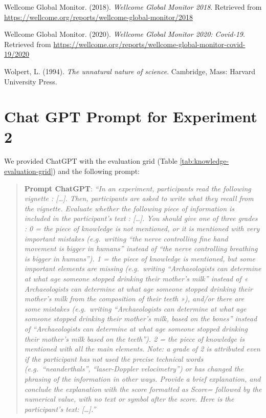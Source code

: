 \documentclass[
  english,
  doc,floatsintext]{apa6}
\newlength{\cslhangindent}
\newenvironment{CSLReferences}[2] %
 {\begin{list}{}{%
  \setlength{\itemindent}{0pt}
  \setlength{\leftmargin}{0pt}
  \setlength{\parsep}{0pt}
  \ifodd #1
   \setlength{\leftmargin}{\cslhangindent}
   \setlength{\itemindent}{-1\cslhangindent}
  \fi
  \setlength{\itemsep}{#2\baselineskip}}}
 {\end{list}}
\begin{document}
\begin{CSLReferences}{1}{0}
Wellcome Global Monitor. (2018). \emph{Wellcome Global Monitor 2018}. Retrieved from \url{https://wellcome.org/reports/wellcome-global-monitor/2018}

Wellcome Global Monitor. (2020). \emph{Wellcome Global Monitor 2020: Covid-19}. Retrieved from \url{https://wellcome.org/reports/wellcome-global-monitor-covid-19/2020}

Wolpert, L. (1994). \emph{The unnatural nature of science}. Cambridge, Mass: Harvard University Press.

\end{CSLReferences}

\newpage

\appendix


\section{Chat GPT Prompt for Experiment 2}\label{gpt-prompt}

\FloatBarrier

We provided ChatGPT with the evaluation grid (Table \ref{tab:knowledge-evaluation-grid}) and the following prompt:

\begin{quote}
\textbf{Prompt ChatGPT}: \emph{``In an experiment, participants read the following vignette : {[}\ldots{]}. Then, participants are asked to write what they recall from the vignette. Evaluate whether the following piece of information is included in the participant's text : {[}\ldots{]}. You should give one of three grades : 0 = the piece of knowledge is not mentioned, or it is mentioned with very important mistakes (e.g.~writing ``the nerve controlling fine hand movement is bigger in humans'' instead of ``the nerve controlling breathing is bigger in humans''). 1 = the piece of knowledge is mentioned, but some important elements are missing (e.g.~writing ``Archaeologists can determine at what age someone stopped drinking their mother's milk'' instead of « Archaeologists can determine at what age someone stopped drinking their mother's milk from the composition of their teeth »), and/or there are some mistakes (e.g.~writing ``Archaeologists can determine at what age someone stopped drinking their mother's milk, based on the bones'' instead of ``Archaeologists can determine at what age someone stopped drinking their mother's milk based on the teeth''). 2 = the piece of knowledge is mentioned with all the main elements. Note: a grade of 2 is attributed even if the participant has not used the precise technical words (e.g.~``neanderthals'', ``laser-Doppler velocimetry'') or has changed the phrasing of the information in other ways. Provide a brief explanation, and conclude the explanation with the score formatted as Score= followed by the numerical value, with no text or symbol after the score. Here is the participant's text: {[}\ldots{]}.''}
\end{quote}
\end{document}
